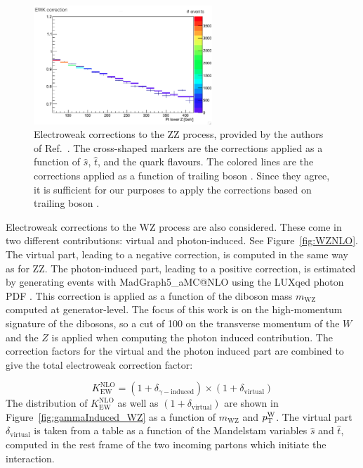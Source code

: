 \begin{figure}[!thbp]
\centering
\includegraphics[width=0.60\textwidth]{figures/ZZ_ewkCorr.png}
\caption{Electroweak corrections to the ZZ process, provided by the authors of Ref.~\cite{Bierweiler:2013dja}.
The cross-shaped markers are the corrections applied as a function of $\hat{s}$, $\hat{t}$, and the quark flavours.
The colored lines are the corrections applied as a function of trailing boson \pt.
Since they agree, it is sufficient for our purposes to apply the corrections based on trailing boson \pt.}
\label{fig:ewkCorrectionCompare}
\end{figure}

Electroweak corrections to the WZ process are also considered. 
These come in two different contributions: virtual and photon-induced. See Figure~\ref{fig:WZNLO}. 
The virtual part, leading to a negative correction, is computed in the same way as for ZZ. 
The photon-induced part, leading to a positive correction, 
is estimated by generating events with MadGraph5\_aMC@NLO 
using the LUXqed photon PDF \cite{Manohar:2016nzj}.
This correction is applied as a function of the diboson mass $m_\mathrm{WZ}$ computed at generator-level.
The focus of this work is on the high-momentum signature of the dibosons,
so a cut of 100 \GeV on the transverse momentum of the $W$ and the $Z$ is applied
when computing the photon induced contribution.
The correction factors for the virtual and the photon induced part are combined to give the total electroweak correction factor:

\begin{equation}
K^\mathrm{NLO}_\mathrm{EW} = (1 + \delta_{\gamma - \mathrm{induced}}) \times (1 + \delta_\mathrm{virtual})
\end{equation}
The distribution of $K^\mathrm{NLO}_\mathrm{EW}$ as well as $(1 + \delta_\mathrm{virtual})$ are shown
in Figure~\ref{fig:gammaInduced_WZ} as a function of $m_\mathrm{WZ}$ and $p_\mathrm{T}^{\mathrm{W}}$.
The virtual part $\delta_\mathrm{virtual}$ is taken from a table as a function of the Mandelstam variables $\hat{s}$ and $\hat{t}$, computed in the rest frame of the two incoming partons which initiate the interaction.
\clearpage

